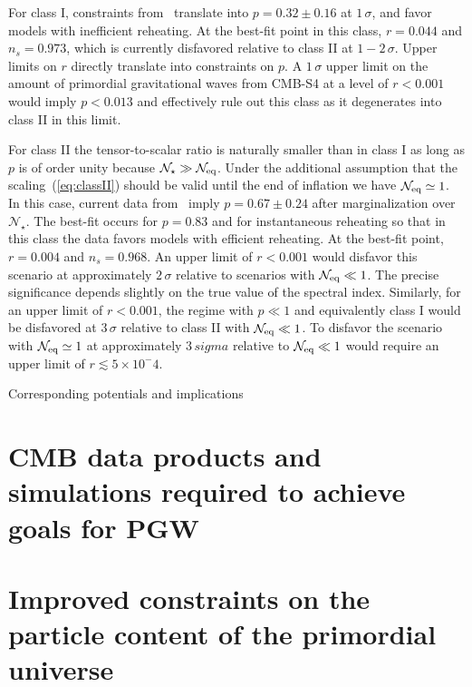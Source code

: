 For class I, constraints from~\cite{bicepkeckplanck15} translate into $p=0.32\pm0.16$ at $1\,\sigma$, and favor models with inefficient reheating. At the best-fit point in this class, $r=0.044$ and $n_s=0.973$, which is currently disfavored relative to class II at $1-2\,\sigma$. Upper limits on $r$ directly translate into constraints on $p$. A $1\,\sigma$ upper limit on the amount of primordial gravitational waves from CMB-S4 at a level of $r<0.001$ would imply $p<0.013$ and effectively rule out this class as it degenerates into class II in this limit. 

For class II the tensor-to-scalar ratio is naturally smaller than in class I as long as $p$ is of order unity because $\mathcal{N}_\star\gg\mathcal{N}_{\rm eq}$. Under the additional assumption that the scaling~(\ref{eq:classII}) should be valid until the end of inflation we have $\mathcal{N}_{\rm eq}\simeq 1$. In this case, current data from~\cite{bicepkeckplanck15} imply $p=0.67\pm0.24$ after marginalization over $\mathcal{N}_\star$. The best-fit occurs for $p=0.83$ and for instantaneous reheating so that in this class the data favors models with efficient reheating. At the best-fit point, $r=0.004$ and $n_s=0.968$. An upper limit of $r<0.001$ would disfavor this scenario at approximately $2\,\sigma$ relative to scenarios with $\mathcal{N}_{\rm eq}\ll 1$. The precise significance depends slightly on the true value of the spectral index. Similarly, for an upper limit of $r<0.001$, the regime with $p\ll1$ and equivalently class I would be disfavored at $3\,\sigma$ relative to class II with $\mathcal{N}_{\rm eq}\ll 1$. To disfavor the scenario with $\mathcal{N}_{\rm eq}\simeq 1$ at approximately $3\,sigma$ relative to $\mathcal{N}_{\rm eq}\ll 1$ would require an upper limit of $r\lesssim 5\times 10^-4$.  

Corresponding potentials and implications

\section{CMB data products and simulations required to achieve goals for PGW}
\label{sec:needs}

\section{Improved constraints on the particle content of the primordial universe}
\label{sec:scalar}

